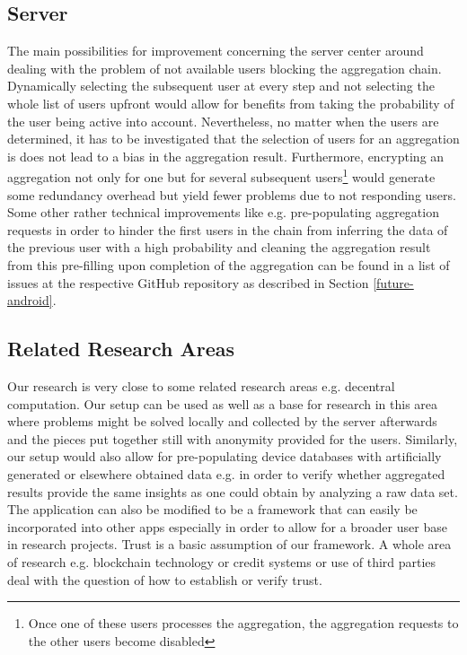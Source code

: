 \subsection{Server}
The main possibilities for improvement concerning the server center around dealing with the problem of not available users blocking the aggregation chain. Dynamically selecting the subsequent user at every step and not selecting the whole list of users upfront would allow for benefits from taking the probability of the user being active into account. Nevertheless, no matter when the users are determined, it has to be investigated that the selection of users for an aggregation is does not lead to a bias in the aggregation result. Furthermore, encrypting an aggregation not only for one but for several subsequent users\footnote{Once one of these users processes the aggregation, the aggregation requests to the other users become disabled} would generate some redundancy overhead but yield fewer problems due to not responding users.
Some other rather technical improvements like e.g. pre-populating aggregation requests in order to hinder the first users in the chain from inferring the data of the previous user with a high probability and cleaning the aggregation result from this pre-filling upon completion of the aggregation can be found in a list of issues at the respective GitHub repository as described in Section \ref{future-android}.

\subsection{Related Research Areas}
Our research is very close to some related research areas e.g. decentral computation. Our setup can be used as well as a base for research in this area where problems might be solved locally and collected by the server afterwards and the pieces put together still with anonymity provided for the users. Similarly, our setup would also allow for pre-populating device databases with artificially generated or elsewhere obtained data e.g. in order to verify whether aggregated results provide the same insights as one could obtain by analyzing a raw data set.
The application can also be modified to be a framework that can easily be incorporated into other apps especially in order to allow for a broader user base in research projects.
Trust is a basic assumption of our framework. A whole area of research e.g. blockchain technology or credit systems or use of third parties deal with the question of how to establish or verify trust.

